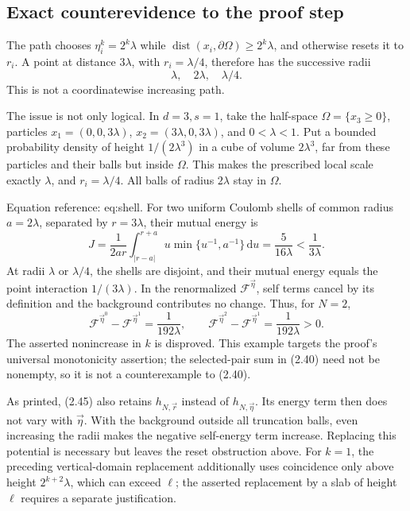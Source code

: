 \documentclass[10pt]{article}
\begin{document}
\subsection*{Exact counterevidence to the proof step}
The path chooses \(\eta_i^k=2^k\lambda\) while \(\operatorname{dist}(x_i,\partial\Omega)\geq2^k\lambda\), and otherwise resets it to \(r_i\). A point at distance \(3\lambda\), with \(r_i=\lambda/4\), therefore has the successive radii \[\lambda,\quad2\lambda,\quad\lambda/4 .\] This is not a coordinatewise increasing path.\par
The issue is not only logical. In \(d=3,s=1\), take the half-space \(\Omega=\{x_3\geq0\}\), particles \(x_1=(0,0,3\lambda)\), \(x_2=(3\lambda,0,3\lambda)\), and \(0<\lambda<1\). Put a bounded probability density of height \(1/(2\lambda^3)\) in a cube of volume \(2\lambda^3\), far from these particles and their balls but inside \(\Omega\). This makes the prescribed local scale exactly \(\lambda\), and \(r_i=\lambda/4\). All balls of radius \(2\lambda\) stay in \(\Omega\).\par
Equation reference: eq:shell. For two uniform Coulomb shells of common radius \(a=2\lambda\), separated by \(r=3\lambda\), their mutual energy is \[
 J=\frac{1}{2ar}\int_{|r-a|}^{r+a}
           u\min\{u^{-1},a^{-1}\}\,\mathrm du
   =\frac{5}{16\lambda}<\frac{1}{3\lambda}.\] At radii \(\lambda\) or \(\lambda/4\), the shells are disjoint, and their mutual energy equals the point interaction \(1/(3\lambda)\). In the renormalized \(\mathcal F^{\vec\eta}\), self terms cancel by its definition and the background contributes no change. Thus, for \(N=2\), \[\mathcal F^{\vec\eta^0}-\mathcal F^{\vec\eta^1}
 =\frac1{192\lambda},\qquad
 \mathcal F^{\vec\eta^2}-\mathcal F^{\vec\eta^1}
 =\frac1{192\lambda}>0 .\] The asserted nonincrease in \(k\) is disproved. This example targets the proof’s universal monotonicity assertion; the selected-pair sum in (2.40) need not be nonempty, so it is not a counterexample to (2.40).\par
As printed, (2.45) also retains \(h_{N,\vec r}\) instead of \(h_{N,\vec\eta}\). Its energy term then does not vary with \(\vec\eta\). With the background outside all truncation balls, even increasing the radii makes the negative self-energy term increase. Replacing this potential is necessary but leaves the reset obstruction above. For \(k=1\), the preceding vertical-domain replacement additionally uses coincidence only above height \(2^{k+2}\lambda\), which can exceed \(\ell\); the asserted replacement by a slab of height \(\ell\) requires a separate justification.\par
\end{document}

